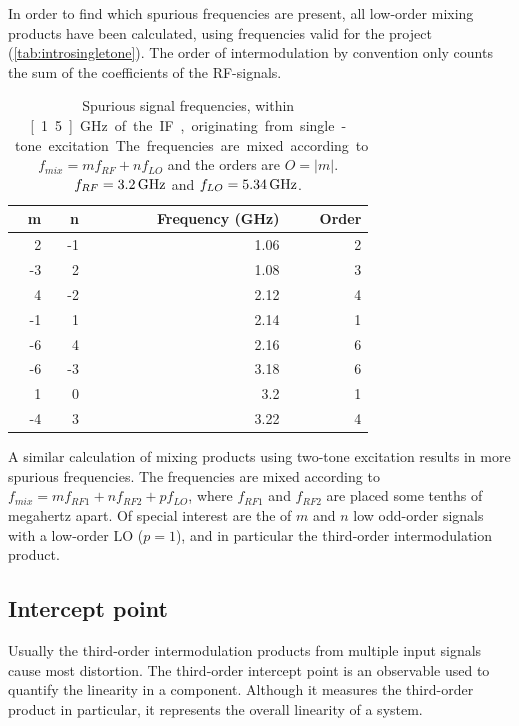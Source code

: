 			In order to find which spurious frequencies are present, all low-order mixing products have been calculated, using frequencies valid for the project (\autoref{tab:introsingletone}). %
			The order of intermodulation by convention only counts the sum of the coefficients of the RF-signals.

			\begin{table}[hbt!]
				\caption[Single-tone spurious signals.]{Spurious signal frequencies, within \unit[1.5]{GHz} of the IF, originating from single-tone excitation. The frequencies are mixed according to $f_{mix} = mf_{RF} + nf_{LO}$ and the orders are $O=|m|$. $ f_{RF}=\unit[3.2]{GHz}$ and $ f_{LO}=\unit[5.34]{GHz}$.}
				\label{tab:introsingletone}
				\centering
				\begin{tabular}{rrrr}
					m & n & Frequency (GHz) & Order \\\hline
					  2 &  -1 & 1.06 & 2 \\
					 -3 &   2 & 1.08 & 3 \\
					  4 &  -2 & 2.12 & 4 \\
					 -1 &   1 & 2.14 & 1 \\
					 -6 &   4 & 2.16 & 6 \\
					 -6 &  -3 & 3.18 & 6 \\
					  1 &   0 &  3.2 & 1 \\
					 -4 &   3 & 3.22 & 4
				\end{tabular}
			\end{table}

			A similar calculation of mixing products using two-tone excitation results in more spurious frequencies. The frequencies are mixed according to $f_{mix} = mf_{RF1} + nf_{RF2} + pf_{LO}$, where $f_{RF1}$ and $f_{RF2}$ are placed some tenths of megahertz apart. Of special interest are the of $m$ and $n$ low odd-order signals with a low-order LO ($p=1$), and in particular the third-order intermodulation product.

		\subsection{Intercept point} \label{sec:ip3}
			Usually the third-order intermodulation products from multiple input signals cause most distortion. The third-order intercept point is an observable used to quantify the linearity in a component. Although it measures the third-order product in particular, it represents the overall linearity of a system.

